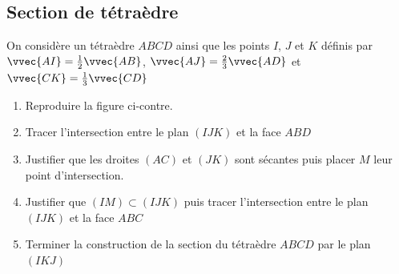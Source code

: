 \documentclass[oneside,12pt]{book}          %
\begin{document}
\subsection{Section de tétraèdre}
\begin{minipage}{0.65\linewidth}
On considère un tétraèdre $ABCD$ ainsi que les points $I$, $J$ et $K$ définis par $\vvec{AI}=\frac{1}{2}\vvec{AB}$, $\vvec{AJ}=\frac{2}{3}\vvec{AD}$ et $\vvec{CK}=\frac{1}{3}\vvec{CD}$\\
\begin{enumerate}
	\item Reproduire la figure ci-contre.
	\item Tracer l'intersection entre le plan $(IJK)$ et la face $ABD$
	\item Justifier que les droites $(AC)$ et $(JK)$ sont sécantes puis placer $M$ leur point d'intersection.
	\item Justifier que $(IM)\subset(IJK)$ puis tracer l'intersection entre le plan $(IJK)$ et la face $ABC$
	\item Terminer la construction de la section du tétraèdre $ABCD$ par le plan $(IKJ)$
\end{enumerate}
\end{minipage}\hfill
\begin{minipage}{0.3\linewidth}
\end{minipage}
\end{document}
